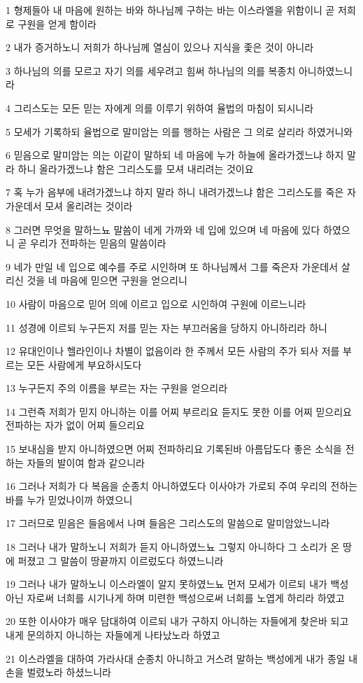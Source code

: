 \par 1 형제들아 내 마음에 원하는 바와 하나님께 구하는 바는 이스라엘을 위함이니 곧 저희로 구원을 얻게 함이라
\par 2 내가 증거하노니 저희가 하나님께 열심이 있으나 지식을 좇은 것이 아니라
\par 3 하나님의 의를 모르고 자기 의를 세우려고 힘써 하나님의 의를 복종치 아니하였느니라
\par 4 그리스도는 모든 믿는 자에게 의를 이루기 위하여 율법의 마침이 되시니라
\par 5 모세가 기록하되 율법으로 말미암는 의를 행하는 사람은 그 의로 살리라 하였거니와
\par 6 믿음으로 말미암는 의는 이같이 말하되 네 마음에 누가 하늘에 올라가겠느냐 하지 말라 하니 올라가겠느냐 함은 그리스도를 모셔 내리려는 것이요
\par 7 혹 누가 음부에 내려가겠느냐 하지 말라 하니 내려가겠느냐 함은 그리스도를 죽은 자 가운데서 모셔 올리려는 것이라
\par 8 그러면 무엇을 말하느뇨 말씀이 네게 가까와 네 입에 있으며 네 마음에 있다 하였으니 곧 우리가 전파하는 믿음의 말씀이라
\par 9 네가 만일 네 입으로 예수를 주로 시인하며 또 하나님께서 그를 죽은자 가운데서 살리신 것을 네 마음에 믿으면 구원을 얻으리니
\par 10 사람이 마음으로 믿어 의에 이르고 입으로 시인하여 구원에 이르느니라
\par 11 성경에 이르되 누구든지 저를 믿는 자는 부끄러움을 당하지 아니하리라 하니
\par 12 유대인이나 헬라인이나 차별이 없음이라 한 주께서 모든 사람의 주가 되사 저를 부르는 모든 사람에게 부요하시도다
\par 13 누구든지 주의 이름을 부르는 자는 구원을 얻으리라
\par 14 그런즉 저희가 믿지 아니하는 이를 어찌 부르리요 듣지도 못한 이를 어찌 믿으리요 전파하는 자가 없이 어찌 들으리요
\par 15 보내심을 받지 아니하였으면 어찌 전파하리요 기록된바 아름답도다 좋은 소식을 전하는 자들의 발이여 함과 같으니라
\par 16 그러나 저희가 다 복음을 순종치 아니하였도다 이사야가 가로되 주여 우리의 전하는 바를 누가 믿었나이까 하였으니
\par 17 그러므로 믿음은 들음에서 나며 들음은 그리스도의 말씀으로 말미암았느니라
\par 18 그러나 내가 말하노니 저희가 듣지 아니하였느뇨 그렇지 아니하다 그 소리가 온 땅에 퍼졌고 그 말씀이 땅끝까지 이르렀도다 하였느니라
\par 19 그러나 내가 말하노니 이스라엘이 알지 못하였느뇨 먼저 모세가 이르되 내가 백성 아닌 자로써 너희를 시기나게 하며 미련한 백성으로써 너희를 노엽게 하리라 하였고
\par 20 또한 이사야가 매우 담대하여 이르되 내가 구하지 아니하는 자들에게 찾은바 되고 내게 문의하지 아니하는 자들에게 나타났노라 하였고
\par 21 이스라엘을 대하여 가라사대 순종치 아니하고 거스려 말하는 백성에게 내가 종일 내 손을 벌렸노라 하셨느니라

